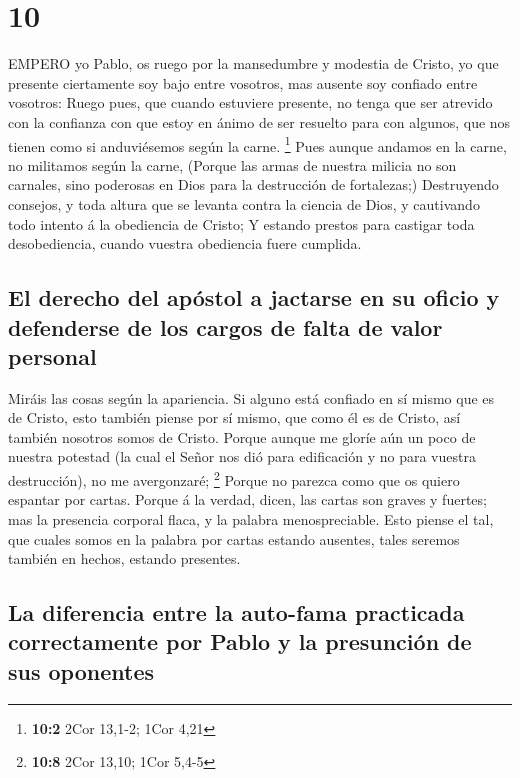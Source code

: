 \hypertarget{section-9}{%
\section{10}\label{section-9}}

 EMPERO yo Pablo, os ruego por la mansedumbre y modestia de
Cristo, yo que presente ciertamente soy bajo entre vosotros, mas ausente
soy confiado entre vosotros:  Ruego pues, que cuando
estuviere presente, no tenga que ser atrevido con la confianza con que
estoy en ánimo de ser resuelto para con algunos, que nos tienen como si
anduviésemos según la carne. \footnote{\textbf{10:2} 2Cor 13,1-2; 1Cor
  4,21}  Pues aunque andamos en la carne, no militamos según
la carne,  (Porque las armas de nuestra milicia no son
carnales, sino poderosas en Dios para la destrucción de fortalezas;)
 Destruyendo consejos, y toda altura que se levanta contra
la ciencia de Dios, y cautivando todo intento á la obediencia de Cristo;
 Y estando prestos para castigar toda desobediencia, cuando
vuestra obediencia fuere cumplida.

\hypertarget{el-derecho-del-apuxf3stol-a-jactarse-en-su-oficio-y-defenderse-de-los-cargos-de-falta-de-valor-personal}{%
\subsection{El derecho del apóstol a jactarse en su oficio y defenderse
de los cargos de falta de valor
personal}\label{el-derecho-del-apuxf3stol-a-jactarse-en-su-oficio-y-defenderse-de-los-cargos-de-falta-de-valor-personal}}

 Miráis las cosas según la apariencia. Si alguno está
confiado en sí mismo que es de Cristo, esto también piense por sí mismo,
que como él es de Cristo, así también nosotros somos de Cristo.
 Porque aunque me gloríe aún un poco de nuestra potestad (la
cual el Señor nos dió para edificación y no para vuestra destrucción),
no me avergonzaré; \footnote{\textbf{10:8} 2Cor 13,10; 1Cor 5,4-5}
 Porque no parezca como que os quiero espantar por cartas.
 Porque á la verdad, dicen, las cartas son graves y
fuertes; mas la presencia corporal flaca, y la palabra menospreciable.
 Esto piense el tal, que cuales somos en la palabra por
cartas estando ausentes, tales seremos también en hechos, estando
presentes.

\hypertarget{la-diferencia-entre-la-auto-fama-practicada-correctamente-por-pablo-y-la-presunciuxf3n-de-sus-oponentes}{%
\subsection{La diferencia entre la auto-fama practicada correctamente
por Pablo y la presunción de sus
oponentes}\label{la-diferencia-entre-la-auto-fama-practicada-correctamente-por-pablo-y-la-presunciuxf3n-de-sus-oponentes}}


